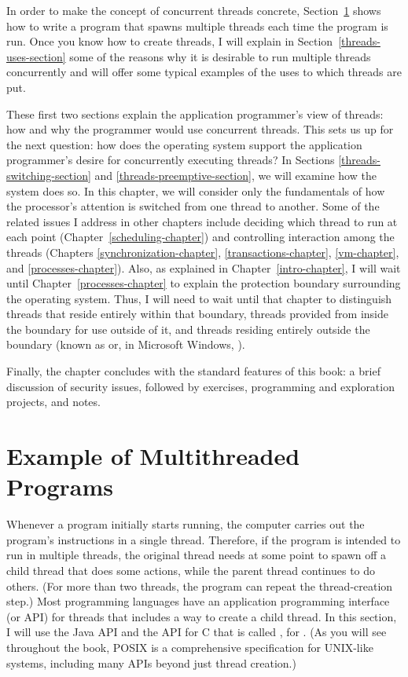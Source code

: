 In order to make the concept of concurrent threads concrete,
Section~\ref{threads-example-section} shows how to write a program
that spawns multiple threads each time the program is run.  Once you
know how to create threads, I will explain in
Section~\ref{threads-uses-section} some of the reasons why it is
desirable to run multiple threads concurrently and will offer some
typical examples of the uses to which threads are put.

These first two sections explain the application programmer's view of
threads: how and why the programmer would use concurrent threads.
This sets us up for the next question: how does the operating system
support the application programmer's desire for concurrently executing
threads?  In Sections \ref{threads-switching-section} and
\ref{threads-preemptive-section}, we will examine how the system does
so.  In this chapter, we will consider only the fundamentals of how
the processor's attention is switched from one thread to another.  Some
of the related issues I address in other chapters include deciding
which thread to run at each point (Chapter~\ref{scheduling-chapter})
and controlling interaction among the threads (Chapters
\ref{synchronization-chapter}, \ref{transactions-chapter},
\ref{vm-chapter}, and \ref{processes-chapter}).
Also, as explained in Chapter~\ref{intro-chapter}, I will wait until
Chapter~\ref{processes-chapter} to explain the protection boundary
surrounding the operating system.  Thus, I will need to wait until
that chapter to distinguish threads that reside entirely within that
boundary, threads provided from inside the boundary for use outside of
it, and threads residing entirely outside the boundary (known as
 or, in Microsoft Windows, ).

Finally, the chapter concludes with the standard features of this
book: a brief discussion of security issues, followed by exercises,
programming and exploration projects, and notes.

\section{Example of Multithreaded Programs}\label{threads-example-section}

Whenever a program initially starts running, the computer carries
out the program's instructions in a single thread. Therefore, if the program is intended
to run in multiple threads, the original thread needs at some point to
spawn off a child thread that does some actions, while the parent
thread continues to do others.  (For more than two threads, the
program can repeat the thread-creation step.)  Most programming
languages have an application programming interface (or API) for
threads that includes a way to create a child thread.  In this
section, I will use
the Java API and the API for C that is called , for
.  (As you will see throughout the book, POSIX is a
comprehensive specification for UNIX-like systems, including many APIs
beyond just thread creation.)

